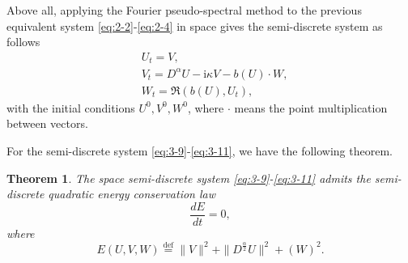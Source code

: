 \documentclass[preprint,compress,3p,10pt,fleqn]{elsarticle}
\numberwithin{equation}{section}
\newtheorem{theorem}{Theorem}[section]
\begin{document}
Above all, applying the Fourier pseudo-spectral method to the previous equivalent system \eqref{eq:2-2}-\eqref{eq:2-4} in space gives the semi-discrete system as follows
\begin{align}
& U_t=V, \label{eq:3-9}\\
& V_t=D^{\alpha} U-\mathrm{i}\kappa V- b(U) \cdot W, \label{eq:3-10}\\
& W_t=\Re\left(b(U), U_t\right),\label{eq:3-11}
\end{align}
with the initial conditions $U^0, V^0, W^0$, where $\cdot$ means the point multiplication between vectors.
	
For the semi-discrete system \eqref{eq:3-9}-\eqref{eq:3-11}, we have the following theorem.
\begin{theorem}	\label{thm3}
The space semi-discrete system \eqref{eq:3-9}-\eqref{eq:3-11} admits the semi-discrete quadratic energy conservation law
\begin{equation}
\frac{dE}{dt}=0, \label{eq:313a}
\end{equation}
where
\begin{equation}
E(U,V,W)\overset{\text{def}}{=}\|V\|^2 + \|D^\frac{\alpha}{2} U\|^2+\left(W\right)^2.\label{eq:313}
\end{equation}
\end{theorem}
\end{document}
